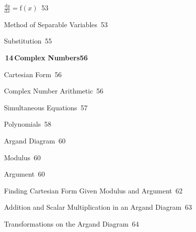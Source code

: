\documentclass[a4paper,openany]{book}
\begin{document}
{\noindent{}\quad $\frac {\mathrm {d}y}{\mathrm {d}x}=\mathrm {f}(x)$\dotfill\ 53\par
\noindent{}\quad Method of Separable Variables\dotfill\ 53\par
\noindent{}\quad Substitution\dotfill\ 55\par
\medskip\noindent\colorbox{blue!8}{\parbox{\dimexpr\textwidth-2\fboxsep}{\large\bfseries\color{blue!50!black}\colorbox{blue!50!black}{\color{white}\,14\,}\quad Complex Numbers\hfill 56}}\par\nopagebreak\smallskip\nopagebreak
\noindent{}\quad Cartesian Form\dotfill\ 56\par
\noindent{}\quad Complex Number Arithmetic\dotfill\ 56\par
\noindent{}\quad Simultaneous Equations\dotfill\ 57\par
\noindent{}\quad Polynomials\dotfill\ 58\par
\noindent{}\quad Argand Diagram\dotfill\ 60\par
\noindent{}\quad Modulus\dotfill\ 60\par
\noindent{}\quad Argument\dotfill\ 60\par
\noindent{}\quad Finding Cartesian Form Given Modulus and Argument\dotfill\ 62\par
\noindent{}\quad Addition and Scalar Multiplication in an Argand Diagram\dotfill\ 63\par
\noindent{}\quad Transformations on the Argand Diagram\dotfill\ 64\par
}
\end{document}
